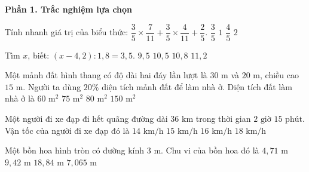 \textbf{Phần 1. Trắc nghiệm lựa chọn}

\begin{ex} %
Tính nhanh giá trị của biểu thức: $\dfrac{3}{5} \times \dfrac{7}{11} + \dfrac{3}{5} \times \dfrac{4}{11} + \dfrac{2}{5}$.
\choice
{$\dfrac{3}{5}$}
{\True $1$}
{$\dfrac{4}{5}$}
{$2$}
\end{ex}

\begin{ex} %
Tìm $x$, biết: $(x - 4{,}2) : 1{,}8 = 3{,}5$.
\choice
{$9{,}5$}
{\True $10{,}5$}
{$10{,}8$}
{$11{,}2$}
\end{ex}

\begin{ex} %
Một mảnh đất hình thang có độ dài hai đáy lần lượt là $30\text{ m}$ và $20\text{ m}$, chiều cao $15\text{ m}$. Người ta dùng $20\%$ diện tích mảnh đất để làm nhà ở. Diện tích đất làm nhà ở là
\choice
{$60\text{ m}^2$}
{\True $75\text{ m}^2$}
{$80\text{ m}^2$}
{$150\text{ m}^2$}
\end{ex}

\begin{ex} %
Một người đi xe đạp đi hết quãng đường dài $36\text{ km}$ trong thời gian $2\text{ giờ }15\text{ phút}$. Vận tốc của người đi xe đạp đó là
\choice
{$14\text{ km/h}$}
{$15\text{ km/h}$}
{\True $16\text{ km/h}$}
{$18\text{ km/h}$}
\end{ex}

\begin{ex} %
Một bồn hoa hình tròn có đường kính $3\text{ m}$. Chu vi của bồn hoa đó là
\choice
{$4{,}71\text{ m}$}
{\True $9{,}42\text{ m}$}
{$18{,}84\text{ m}$}
{$7{,}065\text{ m}$}
\end{ex}

